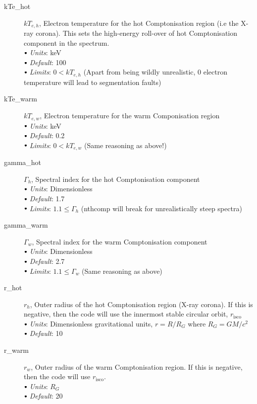 \documentclass[a4paper, 11pt, times, onecolumn]{article}
\newcommand{\kTh}{kT_{e, h}}
\newcommand{\kTw}{kT_{e, w}}
\newcommand{\risco}{r_{\mathrm{isco}}}
\newcommand{\sbt}{\,\begin{picture}(-1,1)(-1,-3)\circle*{3}\end{picture}\ }
\begin{document}
\begin{description}
	\item[kTe\_hot] $\kTh$, Electron temperature for the hot Comptonisation region (i.e the X-ray corona). This sets the high-energy roll-over of hot Comptonisation component in the spectrum. \\
		$\sbt$ {\it Units}: keV \\
		$\sbt$ {\it Default}: 100  \\
		$\sbt$ {\it Limits}: $0 < \kTh$ (Apart from being wildly unrealistic, 0 electron temperature will lead to segmentation faults) 
	
	\item[kTe\_warm] $\kTw$, Electron temperature for the warm Componisation region \\
		$\sbt$ {\it Units}: keV \\
		$\sbt$ {\it Default}: 0.2 \\
		$\sbt$ {\it Limits}: $0 < \kTw$ (Same reasoning as above!)
	
	\item[gamma\_hot] $\Gamma_{h}$, Spectral index for the hot Comptonisation component \\
		$\sbt$ {\it Units}: Dimensionless \\
		$\sbt$ {\it Default}: 1.7 \\
		$\sbt$ {\it Limits}: $1.1 \leq \Gamma_{h}$ ({\sc nthcomp} will break for unrealistically steep spectra)
	
	\item[gamma\_warm] $\Gamma_{w}$, Spectral index for the warm Comptonisation component \\
		$\sbt$ {\it Units}: Dimensionless \\
		$\sbt$ {\it Default}: 2.7 \\
		$\sbt$ {\it Limits}: $1.1 \leq \Gamma_{w}$ (Same reasoning as above)
	
	\item[r\_hot] $r_{h}$, Outer radius of the hot Comptonisation region (X-ray corona). If this is negative, then the code will use the innermost stable circular orbit, $\risco$ \\
		$\sbt$ {\it Units}: Dimensionless gravitational units, $r=R/R_{G}$ where $R_{G} = GM/c^{2}$ \\
		$\sbt$ {\it Default}: 10
	
	\item[r\_warm] $r_{w}$, Outer radius of the warm Comptonisation region. If this is negative, then the code will use $\risco$. \\
		$\sbt$ {\it Units}: $R_{G}$ \\
		$\sbt$ {\it Default}: 20
	

\end{description}
\end{document}
